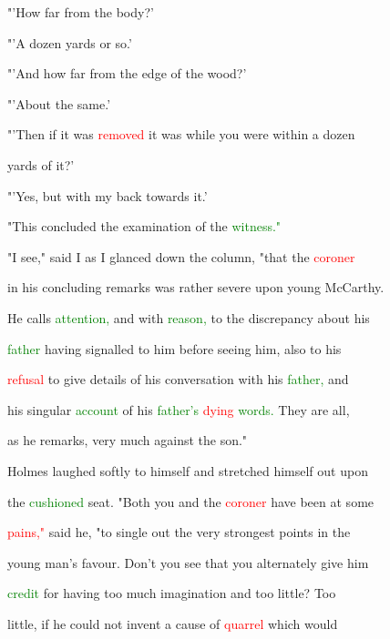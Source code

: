  "'How far from the body?'



 "'A dozen yards or so.'



 "'And how far from the edge of the wood?'



 "'About the same.'



 "'Then if it was \textcolor{red}{removed} it was while you were within a dozen

 yards of it?'



 "'Yes, but with my back towards it.'



 "This concluded the \textcolor{BurntOrange}{examination} of the \textcolor{green}{witness."}



 "I see," said I as I glanced down the column, "that the \textcolor{red}{coroner}

 in his concluding remarks was rather severe upon \textcolor{BurntOrange}{young} McCarthy.

 He calls \textcolor{green}{attention,} and with \textcolor{green}{reason,} to the discrepancy about his

 \textcolor{green}{father} having signalled to him before seeing him, also to his

 \textcolor{red}{refusal} to give details of his conversation with his \textcolor{green}{father,} and

 his singular \textcolor{green}{account} of his \textcolor{green}{father's} \textcolor{red}{dying} \textcolor{green}{words.} They are all,

 as he remarks, very much against the son."



 Holmes \textcolor{BurntOrange}{laughed} softly to himself and stretched himself out upon

 the \textcolor{green}{cushioned} seat. "Both you and the \textcolor{red}{coroner} have been at some

 \textcolor{red}{pains,"} said he, "to single out the very strongest points in the

 \textcolor{BurntOrange}{young} man's favour. Don't you see that you alternately give him

 \textcolor{green}{credit} for having too much imagination and too little? Too

 little, if he could not invent a cause of \textcolor{red}{quarrel} which would

